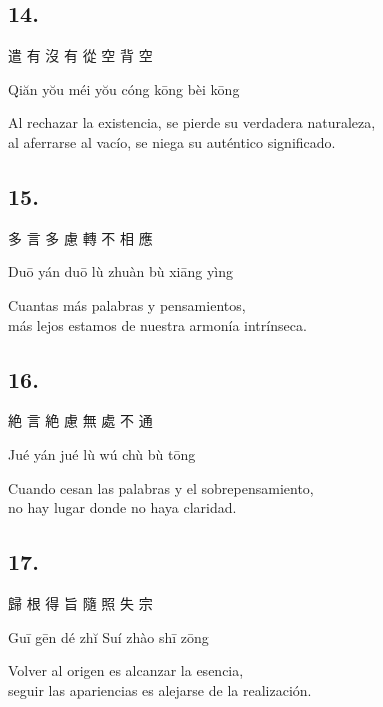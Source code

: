 \documentclass[
  a5paperpaper,
]{article}
\begin{document}
\begin{verseblock}

\hypertarget{section-88}{%
\subsection{14.}\label{section-88}}

遣 有 沒 有 從 空 背 空

Qiăn yŏu méi yŏu cóng kōng bèi kōng

Al rechazar la existencia, se pierde su verdadera naturaleza,\\
al aferrarse al vacío, se niega su auténtico significado.

\end{verseblock}

\begin{verseblock}

\hypertarget{section-89}{%
\subsection{15.}\label{section-89}}

多 言 多 慮 轉 不 相 應

Duō yán duō lù zhuàn bù xiāng yìng

Cuantas más palabras y pensamientos,\\
más lejos estamos de nuestra armonía intrínseca.

\end{verseblock}

\begin{verseblock}

\hypertarget{section-90}{%
\subsection{16.}\label{section-90}}

絶 言 絶 慮 無 處 不 通

Jué yán jué lù wú chù bù tōng

Cuando cesan las palabras y el sobrepensamiento,\\
no hay lugar donde no haya claridad.

\end{verseblock}

\begin{verseblock}

\hypertarget{section-91}{%
\subsection{17.}\label{section-91}}

歸 根 得 旨 隨 照 失 宗

Guī gēn dé zhĭ Suí zhào shī zōng

Volver al origen es alcanzar la esencia,\\
seguir las apariencias es alejarse de la realización.

\end{verseblock}
\end{document}
